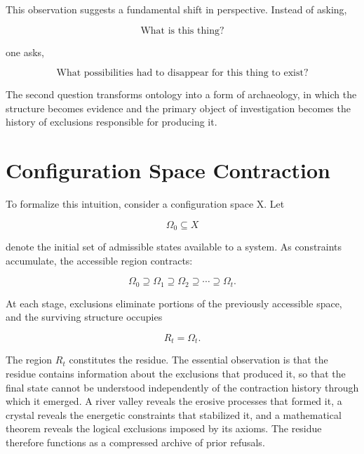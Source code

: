 \documentclass[11pt,oneside]{book}
\theoremstyle{plain}
\theoremstyle{definition}
\theoremstyle{remark}
\begin{document}
This observation suggests a fundamental shift in perspective. Instead of asking,

\begin{equation}
\text{What is this thing?}
\end{equation}

one asks,

\begin{equation}
\text{What possibilities had to disappear for this thing to exist?}
\end{equation}

The second question transforms ontology into a form of archaeology, in which the structure becomes evidence and the primary object of investigation becomes the history of exclusions responsible for producing it.

\section{Configuration Space Contraction}

To formalize this intuition, consider a configuration space X. Let

\begin{equation}
\Omega_0
\subseteq X
\end{equation}

denote the initial set of admissible states available to a system. As constraints accumulate, the accessible region contracts:

\begin{equation}
\Omega_0
\supseteq
\Omega_1
\supseteq
\Omega_2
\supseteq
\cdots
\supseteq
\Omega_t.
\end{equation}

At each stage, exclusions eliminate portions of the previously accessible space, and the surviving structure occupies

\begin{equation}
R_t =
\Omega_t.
\end{equation}

The region \(R_t\) constitutes the residue. The essential observation is that the residue contains information about the exclusions that produced it, so that the final state cannot be understood independently of the contraction history through which it emerged. A river valley reveals the erosive processes that formed it, a crystal reveals the energetic constraints that stabilized it, and a mathematical theorem reveals the logical exclusions imposed by its axioms. The residue therefore functions as a compressed archive of prior refusals.
\end{document}
